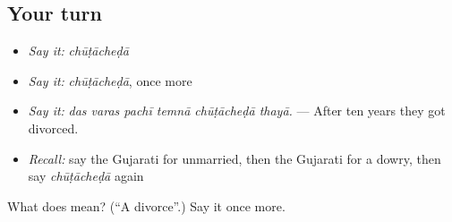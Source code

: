 \subsection*{Your turn}
\begin{itemize}
\raggedright
  \item \emph{Say it:} \emph{chūṭācheḍā}
  \item \emph{Say it:} \emph{chūṭācheḍā}, once more
  \item \emph{Say it:} \emph{das varas pachī temnā chūṭācheḍā thayā.} — After ten years they got divorced.
  \item \emph{Recall:} say the Gujarati for unmarried, then the Gujarati for a dowry, then say \emph{chūṭācheḍā} again
\end{itemize}

\begin{tcolorbox}[breakable,colback=teal!4,colframe=teal!35!black,title={Before you move on}]
What does  mean? (\textquotedblleft{}A divorce\textquotedblright{}.) Say it once more.
\end{tcolorbox}
